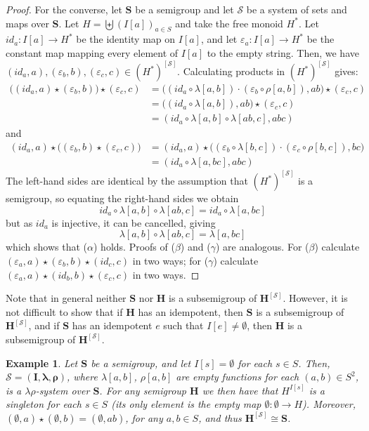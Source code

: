 \documentclass{amsart}
\newtheorem{example}{Example}
\newcommand{\blambda}{\boldsymbol{\lambda}}
\newcommand{\brho}{\boldsymbol{\rho}}
\begin{document}
\begin{proof}
For the converse, let $\mathbf{S}$ be a semigroup and let
$\mathcal{S}$ be a system of sets and maps over $\mathbf{S}$.
Let $H = \biguplus (I[a])_{a\in S}$ 
and take the free monoid $H^*$. Let
$id_a\colon I[a] \to H^*$ be the identity map on $I[a]$,
and let $\varepsilon_a\colon I[a] \to H^*$ be the constant map mapping
every element of $I[a]$ to the empty string. Then, we have
$(id_a,a), (\varepsilon_b,b), (\varepsilon_c,c)\in 
(H^*)^{[\mathcal{S}]}$. Calculating products in $(H^*)^{[\mathcal{S}]}$ gives:
\begin{align*}
\bigl((id_a,a)\star (\varepsilon_b,b)\bigr)\star (\varepsilon_c,c)
 &=  \bigl((id_a\circ \lambda[a,b])\cdot(\varepsilon_b\circ\rho[a,b]), ab\bigr)\star (\varepsilon_c,c)\\
  &=  \bigl((id_a\circ \lambda[a,b]), ab\bigr)\star (\varepsilon_c,c)\\
 &=  (id_a\circ \lambda[a,b]\circ\lambda[ab,c], abc)
\end{align*}  
and 
\begin{align*}
(id_a,a)\star \bigl((\varepsilon_b,b)\star (\varepsilon_c,c)\bigr)
 &=  (id_a,a)\star\bigl((\varepsilon_b\circ\lambda[b,c])\cdot(\varepsilon_c\circ\rho[b,c]), bc\bigr)\\
 &=  (id_a\circ \lambda[a,bc],abc)
\end{align*}
The left-hand sides are identical by the assumption that
$(H^*)^{[\mathcal{S}]}$ is a semigroup, so equating the 
right-hand sides we obtain
$$ 
id_a\circ \lambda[a,b]\circ\lambda[ab,c] = id_a\circ \lambda[a,bc]
$$
but as $id_a$ is injective, it can  be cancelled, giving
$$ 
\lambda[a,b]\circ\lambda[ab,c] = \lambda[a,bc]
$$
which shows that ($\alpha$) holds. Proofs of ($\beta$) and ($\gamma$) are
analogous. For ($\beta$) calculate
$(\varepsilon_a,a)\star (\varepsilon_b,b)\star (id_c,c)$ in two ways; for ($\gamma$)
calculate $(\varepsilon_a,a)\star (id_b,b)\star (\varepsilon_c,c)$ in two ways. 
\end{proof}

Note that in general neither
$\mathbf{S}$ nor $\mathbf{H}$ is a subsemigroup of 
$\mathbf{H}^{[\mathcal{S}]}$. However, it is not difficult to show that
if $\mathbf{H}$ has an idempotent, then $\mathbf{S}$ is a subsemigroup of
$\mathbf{H}^{[\mathcal{S}]}$, and if $\mathbf{S}$ has an idempotent $e$ such
that $I[e]\neq\emptyset$, then $\mathbf{H}$ is a subsemigroup of 
$\mathbf{H}^{[\mathcal{S}]}$.



\begin{example}\label{empty}
Let $\mathbf{S}$ be a semigroup, and let $I[s] = \emptyset$ for each $s\in S$.
Then, $\mathcal{S} = (\mathbf{I},\blambda,\brho)$, where $\lambda[a,b]$,
$\rho[a,b]$ are empty functions for each $(a,b)\in S^2$, is a
$\lambda\rho$-system over $\mathbf{S}$.  
For any semigroup $\mathbf{H}$ we then have that $H^{I[s]}$ is a singleton for each
$s\in S$ \textup{(}its only element is the empty map
$\emptyset\colon \emptyset\to H$\textup{)}. 
Moreover, $(\emptyset,a)\star(\emptyset,b) = (\emptyset, ab)$, for
any $a,b\in S$, and thus $\mathbf{H}^{[\mathcal{S}]}\cong \mathbf{S}$. 
\end{example}  
\end{document}

